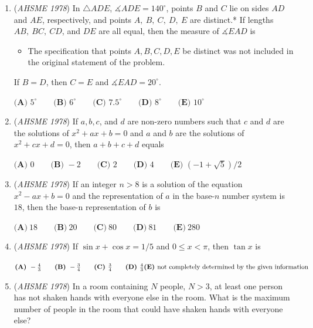 \begin{enumerate}
	\item (\textit{AHSME 1978}) In $\triangle ADE$, $\measuredangle ADE=140^\circ$, points $B$ and $C$ lie on sides $AD$ and $AE$, 
respectively, and points $A,~B,~C,~D,~E$ are distinct.* If lengths $AB,~BC,~CD$, and $DE$ are all equal, 
then the measure of $\measuredangle EAD$ is


 
            \begin{itemize}
        \item The specification that points $A,B,C,D,E$ be distinct was not included in the original statement of the problem.
            \end{itemize}
            If $B=D$, then $C=E$ and $\measuredangle EAD=20^\circ$.     


 $\textbf{(A) }5^\circ\qquad \textbf{(B) }6^\circ\qquad \textbf{(C) }7.5^\circ\qquad \textbf{(D) }8^\circ\qquad \textbf{(E) }10^\circ$


	\item (\textit{AHSME 1978}) If $a,b,c$, and $d$ are non-zero numbers such that $c$ and $d$ are the solutions of $x^2+ax+b=0$ and $a$ and $b$ are 
the solutions of $x^2+cx+d=0$, then $a+b+c+d$ equals


 $\textbf{(A) }0\qquad \textbf{(B) }-2\qquad \textbf{(C) }2\qquad \textbf{(D) }4\qquad  \textbf{(E) }(-1+\sqrt{5})/2$


	\item (\textit{AHSME 1978}) If an integer $n > 8$ is a solution of the equation $x^2 - ax+b=0$ and the representation of $a$ in the base-$n$ number system is $18$, 
then the base-n representation of $b$ is


 $\textbf{(A)}\ 18 \qquad \textbf{(B)}\ 20 \qquad \textbf{(C)}\ 80 \qquad \textbf{(D)}\ 81 \qquad \textbf{(E)}\ 280$


	\item (\textit{AHSME 1978}) If $\sin x+\cos x=1/5$ and $0\le x<\pi$, then $\tan x$ is


 $\textbf{(A) }-\frac{4}{3}\qquad \textbf{(B) }-\frac{3}{4}\qquad \textbf{(C) }\frac{3}{4}\qquad \textbf{(D) }\frac{4}{3}\qquad\\ \textbf{(E) }\text{not completely determined by the given information}$


	\item (\textit{AHSME 1978}) In a room containing $N$ people, $N > 3$, at least one person has not shaken hands with everyone else in the room. 
What is the maximum number of people in the room that could have shaken hands with everyone else?



\end{enumerate}
